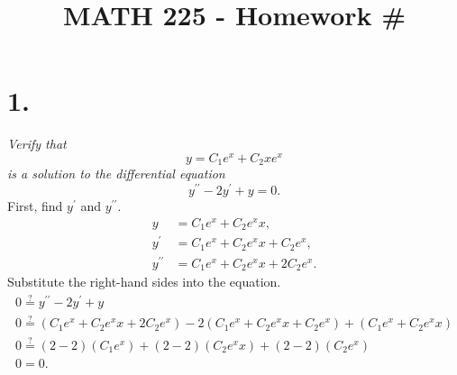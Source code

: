 \documentclass[12pt]{article}
\title{\vspace{-2\baselineskip}MATH 225 - Homework \#\HOMEWORKNUM}
\author{\NAME}
\date{\DATE}
\begin{document}
\maketitle

\section*{1.}
\textit{Verify that}
\begin{equation*}
	y = C_1 e^x + C_2 x e^x
\end{equation*}
\textit{is a solution to the differential equation}
\begin{equation*}
	y^{\prime\prime} - 2y^\prime + y = 0
	.
\end{equation*}
First, find $y^\prime$ and $y^{\prime\prime}$.
\begin{align*}
	y &= C_1 e^x + C_2 e^x x, \\
	y^\prime &= C_1 e^x + C_2 e^x x + C_2 e^x, \\
	y^{\prime\prime} &= C_1 e^x + C_2 e^x x + 2C_2 e^x.
\end{align*}
Substitute the right-hand sides into the equation.
\begin{gather*}
	0 \overset{?}{=}
	y^{\prime\prime} - 2y^\prime + y
	\\
	0 \overset{?}{=}
	(C_1 e^x + C_2 e^x x + 2C_2 e^x)
	- 2(C_1 e^x + C_2 e^x x + C_2 e^x)
	+ (C_1 e^x + C_2 e^x x)
	\\
	0 \overset{?}{=}
	(2 - 2)(C_1 e^x)
	+
	(2 - 2)(C_2 e^x x)
	+
	(2 - 2)(C_2 e^x)
	\\
	0 =
	0
	.
\end{gather*}
\end{document}
